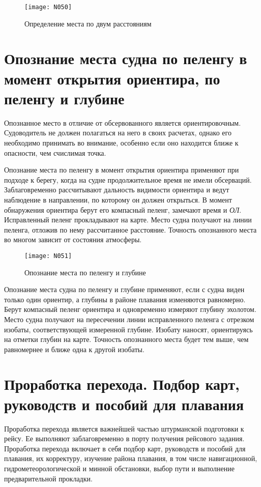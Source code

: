 \begin{figure}[htb]
  \centering{}
  \texttt{[image: N050]}
  \caption{Определение места по двум расстояниям}
  \label{fig:N50}
\end{figure} 

\section{Опознание места судна по пеленгу в момент открытия ориентира, по пеленгу и глубине}

Опознанное место в отличие от обсервованного является
ориентировочным. Судоводитель не должен полагаться на него в своих
расчетах, однако его необходимо принимать во внимание, особенно если
оно находится ближе к опасности, чем счислимая точка.

Опознание места по пеленгу в момент открытия ориентира применяют при
подходе к берегу, когда на судне продолжительное время не имели
обсерваций. Заблаговременно рассчитывают дальность видимости ориентира
и ведут наблюдение в направлении, по которому он должен открыться. В
момент обнаружения ориентира берут его компасный пеленг, замечают
время и \textit{ОЛ}. Исправленный пеленг прокладывают на карте. Место
судна получают на линии пеленга, отложив по нему рассчитанное
расстояние. Точность опознанного места во многом зависит от состояния
атмосферы.

\begin{figure}[htb]
  \centering{}
  \texttt{[image: N051]}
  \caption{Опознание места по пеленгу и глубине}
  \label{fig:N51}
\end{figure} 

Опознание места судна по пеленгу и глубине применяют, если с судна
виден только один ориентир, а глубины в районе плавания изменяются
равномерно. Берут компасный пеленг ориентира и одновременно измеряют
глубину эхолотом. Место судна получают на пересечении линии
исправленного пеленга с отрезком изобаты, соответствующей измеренной
глубине. Изобату наносят, ориентируясь на отметки глубин на
карте. Точность опознанного места будет тем выше, чем равномернее и
ближе одна к другой изобаты.

\section{Проработка перехода. Подбор карт, руководств и пособий для плавания}

Проработка перехода является важнейшей частью штурманской подготовки к
рейсу. Ее выполняют заблаговременно в порту получения рейсового
задания. Проработка перехода включает в себя подбор карт, руководств и
пособий для плавания, их корректуру, изучение района плавания, в том
числе навигационной, гидрометеорологической и минной обстановки, выбор
пути и выполнение предварительной прокладки.

